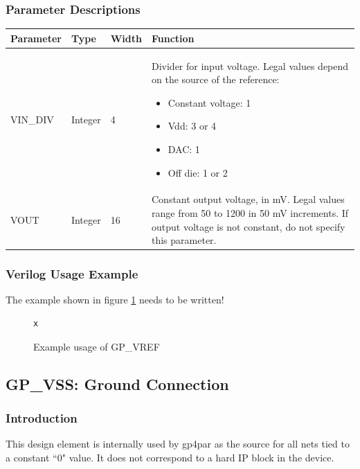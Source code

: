 \documentclass{article}
\begin{document}
\subsubsection{Parameter Descriptions}

\begin{tabularx}{5in}{|l|l|l|X|}
\hline
{\bfseries Parameter} & {\bfseries Type} & {\bfseries Width} & {\bfseries Function} \\
\hline
VIN\_DIV & Integer & 4 &
	Divider for input voltage. Legal values depend on the source of the reference:
	\begin{itemize}
		\item Constant voltage: 1
		\item Vdd: 3 or 4
		\item DAC: 1
		\item Off die: 1 or 2
	\end{itemize}
\\
\hline 
VOUT & Integer & 16 &
	Constant output voltage, in mV. Legal values range from 50 to 1200 in 50 mV increments.
	If output voltage is not constant, do not specify this parameter.\\
\hline
\end{tabularx}

\subsubsection{Verilog Usage Example}

The example shown in figure \ref{gp-vref-example} needs to be written!

\begin{figure}[h]
\begin{lstlisting}
x
\end{lstlisting}
\caption{Example usage of GP\_VREF}
\label{gp-vref-example}
\end{figure}


\pagebreak
\subsection{GP\_VSS: Ground Connection}

\subsubsection{Introduction}
This design element is internally used by gp4par as the source for all nets tied to a constant ``0" value. It does not 
correspond to a hard IP block in the device.
\end{document}
